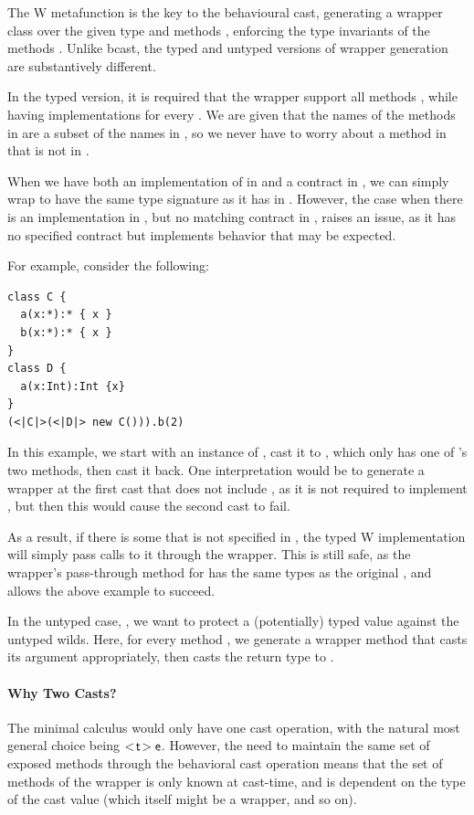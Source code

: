 \documentclass[a4paper,USenglish]{tex/lipics-v2016}
\begin{document}
The W metafunction is the key to the behavioural cast, generating a wrapper
class \D over the given type \C and methods \md[1], enforcing the type
invariants of the methods \mdp[1]. Unlike bcast, the typed and untyped
versions of wrapper generation are substantively different.

In the typed version, it is required that the wrapper support all methods
\mdp[1], while having implementations for every \md[1]. We are given that the
names of the methods in \mdp[1] are a subset of the names in \md[1], so we
never have to worry about a method in \mdp[1] that is not in \md[1].

When we have both an implementation of \m in \md[1] and a contract \m in
\mdp[1], we can simply wrap \m to have the same type signature as it has in
\mdp[1]. However, the case when there is an implementation \m in \md[1], but
no matching contract in \mdp[1], raises an issue, as it has no specified
contract but implements behavior that may be expected.

For example, consider the following:

\begin{verbatim}
class C {
  a(x:*):* { x }
  b(x:*):* { x }
}
class D {
  a(x:Int):Int {x}
}
(<|C|>(<|D|> new C())).b(2)
\end{verbatim}

In this example, we start with an instance of , cast it to , which
only has one of 's two methods, then cast it back. One interpretation
would be to generate a wrapper at the first cast that does not include ,
as it is not required to implement , but then this would cause the
second cast to fail.

As a result, if there is some \m that is not specified in \mdp[1], the typed W
implementation will simply pass calls to it through the wrapper. This is still
safe, as the wrapper's pass-through method for \m has the same types as the
original \m, and allows the above example to succeed.

In the untyped case, , we want to protect a (potentially) typed
value against the untyped wilds. Here, for every method \m, we generate a 
wrapper method that casts its argument appropriately, then casts the return
type to \any. 

\paragraph{Why Two Casts?}

The minimal calculus would only have one cast operation, with the natural most
general choice being $\SubCast\t\e$. However, the need to maintain the same
set of exposed methods through the behavioral cast operation means that the
set of methods of the wrapper is only known at cast-time, and is dependent on
the type of the cast value (which itself might be a wrapper, and so on). 
\end{document}
